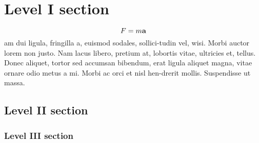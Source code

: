\documentclass[12 pt]{article}
\begin{document}
\tableofcontents
\section{Level I section}
\lipsum[1]
\[
    F = m\vb{a}
\]
am dui ligula, fringilla a, euismod sodales, sollici-tudin vel, wisi.
Morbi auctor lorem non justo.
Nam  lacus libero, pretium at, lobortis vitae, ultricies et, tellus.
Donec aliquet, tortor sed accumsan bibendum, erat ligula aliquet magna, vitae ornare odio metus a mi.
Morbi ac orci et nisl hen-drerit mollis.
Suspendisse ut massa.

\subsection{Level II section}
\lipsum[3]

\subsubsection{Level III section}
\lipsum[4]
\end{document}
